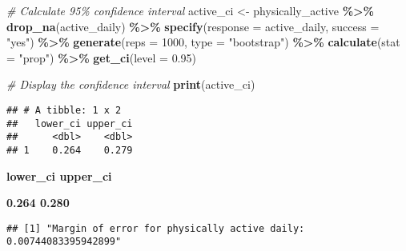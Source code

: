 \documentclass[
]{article}
\newenvironment{Shaded}{\begin{snugshade}}{\end{snugshade}}
\newcommand{\AttributeTok}[1]{\textcolor[rgb]{0.13,0.29,0.53}{#1}}
\newcommand{\CommentTok}[1]{\textcolor[rgb]{0.56,0.35,0.01}{\textit{#1}}}
\newcommand{\DecValTok}[1]{\textcolor[rgb]{0.00,0.00,0.81}{#1}}
\newcommand{\FloatTok}[1]{\textcolor[rgb]{0.00,0.00,0.81}{#1}}
\newcommand{\FunctionTok}[1]{\textcolor[rgb]{0.13,0.29,0.53}{\textbf{#1}}}
\newcommand{\NormalTok}[1]{#1}
\newcommand{\OtherTok}[1]{\textcolor[rgb]{0.56,0.35,0.01}{#1}}
\newcommand{\SpecialCharTok}[1]{\textcolor[rgb]{0.81,0.36,0.00}{\textbf{#1}}}
\newcommand{\StringTok}[1]{\textcolor[rgb]{0.31,0.60,0.02}{#1}}
\begin{document}
\begin{Shaded}
\begin{Highlighting}[]
\CommentTok{\# Calculate 95\% confidence interval}
\NormalTok{active\_ci }\OtherTok{\textless{}{-}}\NormalTok{ physically\_active }\SpecialCharTok{\%\textgreater{}\%}
  \FunctionTok{drop\_na}\NormalTok{(active\_daily) }\SpecialCharTok{\%\textgreater{}\%}
  \FunctionTok{specify}\NormalTok{(}\AttributeTok{response =}\NormalTok{ active\_daily, }\AttributeTok{success =} \StringTok{"yes"}\NormalTok{) }\SpecialCharTok{\%\textgreater{}\%}
  \FunctionTok{generate}\NormalTok{(}\AttributeTok{reps =} \DecValTok{1000}\NormalTok{, }\AttributeTok{type =} \StringTok{"bootstrap"}\NormalTok{) }\SpecialCharTok{\%\textgreater{}\%}
  \FunctionTok{calculate}\NormalTok{(}\AttributeTok{stat =} \StringTok{"prop"}\NormalTok{) }\SpecialCharTok{\%\textgreater{}\%}
  \FunctionTok{get\_ci}\NormalTok{(}\AttributeTok{level =} \FloatTok{0.95}\NormalTok{)}
\end{Highlighting}
\end{Shaded}

\begin{Shaded}
\begin{Highlighting}[]
\CommentTok{\# Display the confidence interval}
\FunctionTok{print}\NormalTok{(active\_ci)}
\end{Highlighting}
\end{Shaded}

\begin{verbatim}
## # A tibble: 1 x 2
##   lower_ci upper_ci
##      <dbl>    <dbl>
## 1    0.264    0.279
\end{verbatim}

\textbf{lower\_ci upper\_ci}

\textbf{0.264 0.280}

\begin{Shaded}
\end{Shaded}

\begin{verbatim}
## [1] "Margin of error for physically active daily: 0.00744083395942899"
\end{verbatim}
\end{document}
